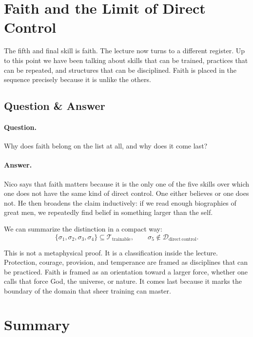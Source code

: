 \section{Faith and the Limit of Direct Control}

The fifth and final skill is faith. The lecture now turns to a different register. Up to this point we have been talking about skills that can be trained, practices that can be repeated, and structures that can be disciplined. Faith is placed in the sequence precisely because it is unlike the others.

\subsection{Question \& Answer}

\paragraph{Question.} Why does faith belong on the list at all, and why does it come last?

\paragraph{Answer.} Nico says that faith matters because it is the only one of the five skills over which one does not have the same kind of direct control. One either believes or one does not. He then broadens the claim inductively: if we read enough biographies of great men, we repeatedly find belief in something larger than the self.

We can summarize the distinction in a compact way:
\begin{equation}
\{\sigma_1,\sigma_2,\sigma_3,\sigma_4\}\subseteq \mathcal{T}_{\mathrm{trainable}},
\qquad
\sigma_5\notin \mathcal{D}_{\mathrm{direct\ control}}.
\end{equation}

This is not a metaphysical proof. It is a classification inside the lecture. Protection, courage, provision, and temperance are framed as disciplines that can be practiced. Faith is framed as an orientation toward a larger force, whether one calls that force God, the universe, or nature. It comes last because it marks the boundary of the domain that sheer training can master.

\section{Summary}

